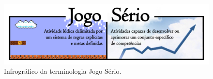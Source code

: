 



\pagebreak

\begin{figure}[htb]

	\caption{\label{fig:JS}Infrográfico da terminologia Jogo Sério.}\vspace{-0,5cm}
  \begin{center}
    \includegraphics[width=\linewidth]{./Figuras/JogoSerio.pdf}
	\end{center} \vspace{-0,9cm}

\end{figure}

